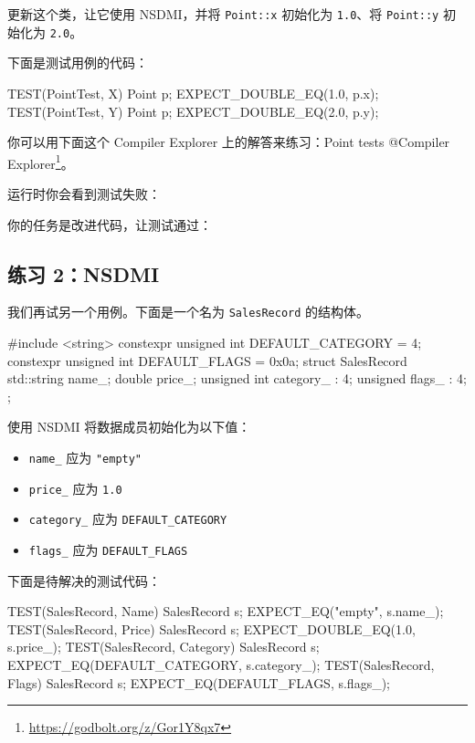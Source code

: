 更新这个类，让它使用 NSDMI，并将 \texttt{Point::x} 初始化为 \texttt{1.0}、将 \texttt{Point::y} 初始化为 \texttt{2.0}。

下面是测试用例的代码：

\begin{codebox}[cpp]
TEST(PointTest, X) {
Point p;
EXPECT_DOUBLE_EQ(1.0, p.x);
}
TEST(PointTest, Y) {
Point p;
EXPECT_DOUBLE_EQ(2.0, p.y);
}
\end{codebox}

你可以用下面这个 Compiler Explorer 上的解答来练习：Point tests @Compiler Explorer\footnote{\url{https://godbolt.org/z/Gor1Y8qx7}}。

运行时你会看到测试失败：

你的任务是改进代码，让测试通过：


\subsection{练习 2：NSDMI}

我们再试另一个用例。下面是一个名为 \texttt{SalesRecord} 的结构体。

\begin{codebox}[cpp]
#include <string>
constexpr unsigned int DEFAULT_CATEGORY = 4;
constexpr unsigned int DEFAULT_FLAGS = 0x0a;
struct SalesRecord {
std::string name_;
double price_;
unsigned int category_ : 4;
unsigned flags_ : 4;
};
\end{codebox}

使用 NSDMI 将数据成员初始化为以下值：

\begin{itemize}
\item \texttt{name\_} 应为 \texttt{"empty"}
\item \texttt{price\_} 应为 \texttt{1.0}
\item \texttt{category\_} 应为 \texttt{DEFAULT\_CATEGORY}
\item \texttt{flags\_} 应为 \texttt{DEFAULT\_FLAGS}
\end{itemize}

下面是待解决的测试代码：


\begin{codebox}[cpp]
TEST(SalesRecord, Name) {
SalesRecord s;
EXPECT_EQ("empty", s.name_);
}
TEST(SalesRecord, Price) {
SalesRecord s;
EXPECT_DOUBLE_EQ(1.0, s.price_);
}
TEST(SalesRecord, Category) {
SalesRecord s;
EXPECT_EQ(DEFAULT_CATEGORY, s.category_);
}
TEST(SalesRecord, Flags) {
SalesRecord s;
EXPECT_EQ(DEFAULT_FLAGS, s.flags_);
}
\end{codebox}

